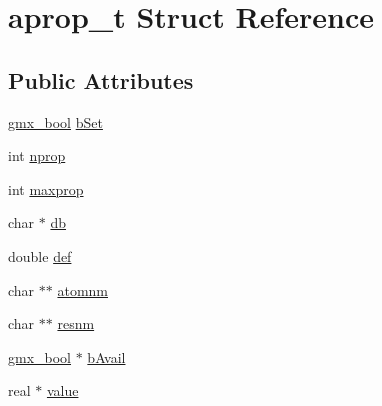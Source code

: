 \hypertarget{structaprop__t}{\section{aprop\-\_\-t \-Struct \-Reference}
\label{structaprop__t}
}
\subsection*{\-Public \-Attributes}
\begin{DoxyCompactItemize}
\item 
\hyperlink{include_2types_2simple_8h_a8fddad319f226e856400d190198d5151}{gmx\-\_\-bool} \hyperlink{structaprop__t_aa883b8f3d7dcd04aa5f299d911c7b0c7}{b\-Set}
\item 
int \hyperlink{structaprop__t_ae9cfe44d077543950d87908fe2e03106}{nprop}
\item 
int \hyperlink{structaprop__t_a51a3d7a25a13871688952ed10d54f243}{maxprop}
\item 
char $\ast$ \hyperlink{structaprop__t_a32e829d904732f22b5a29cb27f988532}{db}
\item 
double \hyperlink{structaprop__t_ac19822aa19051408907517986c9d8a48}{def}
\item 
char $\ast$$\ast$ \hyperlink{structaprop__t_a50d86df216b28dcd14389a575a2ee920}{atomnm}
\item 
char $\ast$$\ast$ \hyperlink{structaprop__t_ad8fa1dbc65a5f82d0c7b1a2c2822db00}{resnm}
\item 
\hyperlink{include_2types_2simple_8h_a8fddad319f226e856400d190198d5151}{gmx\-\_\-bool} $\ast$ \hyperlink{structaprop__t_a99619b7ed2bacbaa353ea3fd01e5ae43}{b\-Avail}
\item 
real $\ast$ \hyperlink{structaprop__t_ad3762650463f517a5cc3a50a89558daa}{value}
\end{DoxyCompactItemize}


